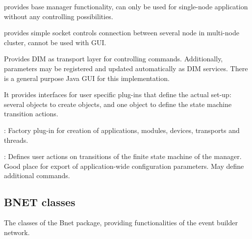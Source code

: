 \begin{description}
\begin{compactenum}
\begin{compactitem}[$\bullet$]
   \item {} provides base manager functionality,
      can only be used for single-node application without any controlling possibilities. 
   \item {} provides simple socket controls connection between
      several node in multi-node cluster, cannot be used with GUI.
   \item {} Provides DIM \cite{DIM} as 
	 transport layer for controlling commands. Additionally, 
	 parameters may be registered and updated automatically as 
	 DIM services. There is a general purpose Java GUI for this implementation. 
\end{compactitem}
      
      \item It provides interfaces for user specific plug-ins that define 
      the actual set-up: \\
      several  objects to create objects, and 
      one  object to define the state machine transition actions.
\end{compactenum}

\item[\class{dabc::Factory}] : 
	Factory plug-in for creation of applications, modules, devices, transports and threads.

\item[\class{dabc::Application}] : 
Defines user actions on transitions of the finite state machine of the manager.
Good place for export of application-wide configuration parameters. 
May define additional commands.
\end{description}




\subsection{BNET classes}
\label{prog_bnet_classes}
The classes of the Bnet package, providing functionalities of the event builder network.



